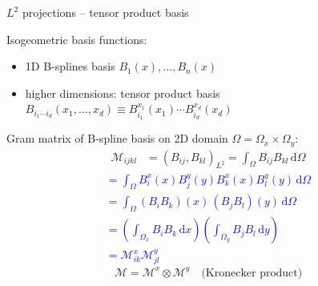 \documentclass[c]{beamer}
\newcommand{\inblue}[1]{\textcolor{blue}{#1}}
\newcommand{\Prod}[2]{(#1, #2)_{L^2}}
\begin{document}
\begin{frame}{$L^2$ projections -- tensor product basis}

Isogeometric basis functions:
\begin{itemize}
  \item 1D B-splines basis $B_1(x),\ldots, B_n(x)$
  \item higher dimensions: tensor product basis\\
        $B_{i_1\cdots i_d}(x_1,\ldots,x_d)
        \equiv B^{x_1}_{i_1}(x_1)\cdots B^{x_d}_{i_d}(x_d)$ \\
\end{itemize}
Gram matrix of B-spline basis on 2D domain $\Omega = \Omega_x \times \Omega_y$:
\begin{equation*}
  \begin{aligned}
  \mathcal{M}_{ijkl} &=
  \Prod{B_{ij}}{B_{kl}} =
  \int_\Omega B_{ij}B_{kl}\,\mbox{d}\Omega 
  \end{aligned}
\end{equation*}
 \inblue{\begin{equation*}
  \begin{aligned}
=\int_\Omega B^x_i(x) B^y_j(y) B^x_k(x) B^y_l(y) \,\mbox{d}\Omega \\
  = \int_\Omega (B_i B_k)(x)\,(B_j B_l)(y)\,\mbox{d}\Omega  \\
  = \left(\int_{\Omega_x} B_i B_k \,\mbox{d}x\right)
  \left(\int_{\Omega_y} B_j B_l \,\mbox{d}y\right) \\
  = \mathcal{M}^x_{ik} \mathcal{M}^y_{jl}
  \end{aligned}
\end{equation*}}
\begin{equation*}
\mathcal{M} = \mathcal{M}^x \otimes \mathcal{M}^y \quad\text{(Kronecker product)}
\end{equation*}

\end{frame}

\end{document}
